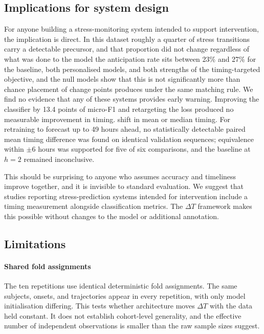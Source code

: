 \documentclass[preprint,12pt,authoryear]{elsarticle}
\newcommand{\dt}{$\Delta T$}
\providecommand{\DIFaddtex}[1]{{\protect\color{blue} \sf #1}} %
\providecommand{\DIFdeltex}[1]{{\protect\color{red} \scriptsize #1}} %
\providecommand{\DIFaddbegin}{} %
\providecommand{\DIFaddend}{} %
\providecommand{\DIFdelbegin}{} %
\providecommand{\DIFdelend}{} %
\providecommand{\DIFadd}[1]{\texorpdfstring{\DIFaddtex{#1}}{#1}} %
\providecommand{\DIFdel}[1]{\texorpdfstring{\DIFdeltex{#1}}{}} %
\newcommand{\DIFscaledelfig}{0.5}
\newlength{\DIFdelgraphicswidth} %
\newlength{\DIFdelgraphicsheight} %
\newcommand{\DIFaddincludegraphics}[2][]{{\color{blue}\fbox{\DIFOincludegraphics[#1]{#2}}}} %
\newcommand{\DIFdelincludegraphics}[2][]{%
\sbox{\DIFdelgraphicsbox}{\DIFOincludegraphics[#1]{#2}}%
\settoboxwidth{\DIFdelgraphicswidth}{\DIFdelgraphicsbox} %
\settoboxtotalheight{\DIFdelgraphicsheight}{\DIFdelgraphicsbox} %
\scalebox{\DIFscaledelfig}{%
\parbox[b]{\DIFdelgraphicswidth}{\usebox{\DIFdelgraphicsbox}\\[-\baselineskip] \rule{\DIFdelgraphicswidth}{0em}}\llap{\resizebox{\DIFdelgraphicswidth}{\DIFdelgraphicsheight}{%
\setlength{\unitlength}{\DIFdelgraphicswidth}%
\begin{picture}(1,1)%
\thicklines\linethickness{2pt} %
{\color[rgb]{1,0,0}\put(0,0){\framebox(1,1){}}}%
{\color[rgb]{1,0,0}\put(0,0){\line( 1,1){1}}}%
{\color[rgb]{1,0,0}\put(0,1){\line(1,-1){1}}}%
\end{picture}%
}\hspace*{3pt}}} %
} %
\DeclareRobustCommand{\DIFaddbegin}{\DIFOaddbegin \let\includegraphics\DIFaddincludegraphics} %
\DeclareRobustCommand{\DIFaddend}{\DIFOaddend \let\includegraphics\DIFOincludegraphics} %
\DeclareRobustCommand{\DIFdelbegin}{\DIFOdelbegin \let\includegraphics\DIFdelincludegraphics} %
\DeclareRobustCommand{\DIFdelend}{\DIFOaddend \let\includegraphics\DIFOincludegraphics} %
\begin{document}
\subsection{Implications for system design}

For anyone building a stress-monitoring system intended to support
intervention, the implication is direct. In this dataset \DIFdelbegin \DIFdel{roughly a
quarter of stress transitions carry a detectable precursor, and that
proportion did not change regardless of what was done to the model}\DIFdelend \DIFaddbegin \DIFadd{the
anticipation rate sits between 23\% and 27\% for the baseline, both
personalised models, and both strengths of the timing-targeted
objective, and the null models show that this is not significantly
more than chance placement of change points produces under the same
matching rule. We find no evidence that any of these systems provides
early warning}\DIFaddend . Improving the classifier by \DIFdelbegin \DIFdel{13.4 }\DIFdelend \DIFaddbegin \DIFadd{13.3 }\DIFaddend points of micro-F1 \DIFaddbegin \DIFadd{and
retargeting the loss }\DIFaddend produced no measurable \DIFdelbegin \DIFdel{improvement in timing.
}\DIFdelend \DIFaddbegin \DIFadd{shift in mean or median
timing. For retraining to forecast up to 49 hours ahead, no
statistically detectable paired mean timing difference was found on
identical validation sequences; equivalence within $\pm 6$ hours was
supported for five of six comparisons, and the baseline at $h = 2$
remained inconclusive.
}\DIFaddend 

This should be surprising to anyone who assumes accuracy and timeliness
improve together, and it is invisible to standard evaluation. We suggest
that studies reporting stress-prediction systems intended for
intervention include a timing measurement alongside classification
metrics. The \dt{} framework makes this possible without changes to the
model or additional annotation.

\subsection{Limitations}
\label{sec:limits}

\DIFdelbegin %
\DIFdelend \DIFaddbegin \paragraph{Shared fold assignments} \DIFaddend The ten repetitions use identical
deterministic fold assignments. The same subjects, onsets, and
trajectories appear in every repetition, with only model initialisation
differing. This tests whether architecture moves \dt{} with the data
held constant. It does not establish cohort-level generality, and the
effective number of independent observations is smaller than the raw
sample sizes suggest.
\end{document}
